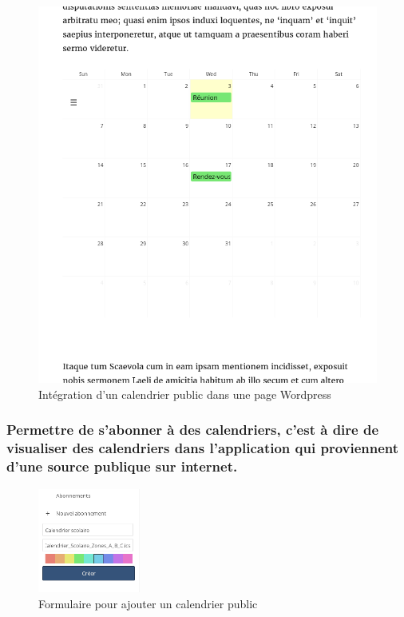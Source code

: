 \documentclass[10pt,a4paper]{report}
\begin{document}
	\begin{figure}
		\includegraphics[width=0.5\paperwidth]{images/integration_wordpress}
		\caption*{Intégration d'un calendrier public dans une page Wordpress}
		\label{normal_case}
	\end{figure}
	
	\subsubsection{Permettre de s'abonner à des calendriers, c'est à dire de visualiser des calendriers dans l'application qui proviennent d'une source publique sur internet.}
	
	\begin{figure}[ht]
		\centering
		\includegraphics[width=0.30\textwidth]{images/creation_abonnement.png}
		\caption*{Formulaire pour ajouter un calendrier public}
		\label{normal_case}
	\end{figure}
	
\end{document}
